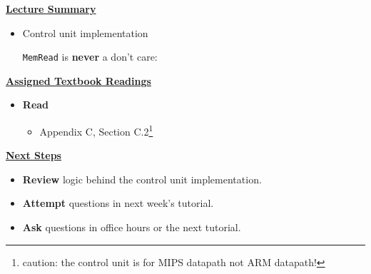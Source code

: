 \begin{frame}[fragile]
 \underline{\textbf{Lecture Summary}}
 \begin{itemize}
 \item Control unit implementation
 \begin{tcolorbox}[enhanced,attach boxed title to top center={yshift=-3mm,yshifttext=-1mm},
  colback=green!5!white,colframe=green!75!black,colbacktitle=green!80!black,
  title=Remember It,fonttitle=\bfseries,
  boxed title style={size=small,colframe=green!50!black} ]
{\footnotesize {\tt MemRead} is \textbf{never} a don't care:}

\end{tcolorbox}
\end{itemize}

 \underline{\textbf{Assigned Textbook Readings}}
\begin{itemize}
     \item \textbf{Read} 
     \begin{itemize}
   \item   Appendix C, Section C.2\footnote{caution: the control unit is for MIPS datapath not ARM datapath!}
     \end{itemize}
     \end{itemize}
    \underline{\textbf{Next Steps}}
    \begin{itemize}
     \item \textbf{Review} logic behind the control unit implementation. 
\item \textbf{Attempt} questions in next week's tutorial. 
    \item \textbf{Ask} questions in office hours or the next tutorial.
 \end{itemize}

\end{frame}